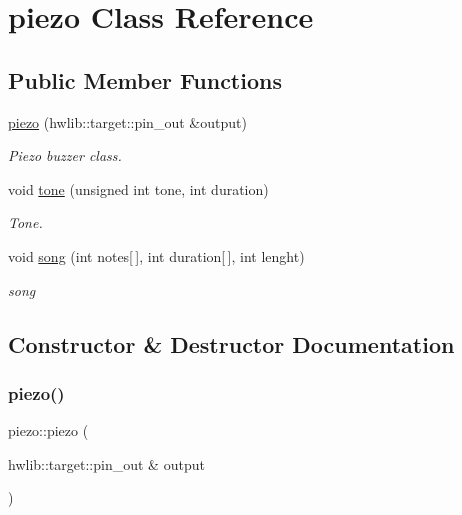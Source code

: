 \hypertarget{classpiezo}{}\section{piezo Class Reference}
\label{classpiezo}
\subsection*{Public Member Functions}
\begin{DoxyCompactItemize}
\item 
\mbox{\hyperlink{classpiezo_aa7daa7fd80b5580bd2c5e379a69ffdc4}{piezo}} (hwlib\+::target\+::pin\+\_\+out \&output)
\begin{DoxyCompactList}\small\item\em Piezo buzzer class. \end{DoxyCompactList}\item 
void \mbox{\hyperlink{classpiezo_ac14361f4fb7fe063b8c4455946220ee4}{tone}} (unsigned int tone, int duration)
\begin{DoxyCompactList}\small\item\em Tone. \end{DoxyCompactList}\item 
void \mbox{\hyperlink{classpiezo_a4e92d8bc5b101f9862a089134518c55f}{song}} (int notes\mbox{[}$\,$\mbox{]}, int duration\mbox{[}$\,$\mbox{]}, int lenght)
\begin{DoxyCompactList}\small\item\em song \end{DoxyCompactList}\end{DoxyCompactItemize}


\subsection{Constructor \& Destructor Documentation}
\mbox{\label{classpiezo_aa7daa7fd80b5580bd2c5e379a69ffdc4}} 
\subsubsection{\texorpdfstring{piezo()}{piezo()}}
{\footnotesize\ttfamily piezo\+::piezo (\begin{DoxyParamCaption}\item[{hwlib\+::target\+::pin\+\_\+out \&}]{output }\end{DoxyParamCaption})}



